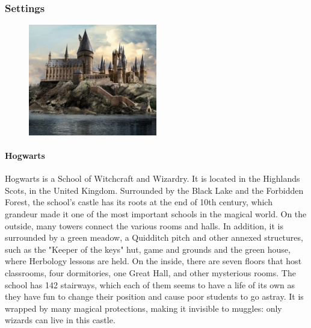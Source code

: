 \pagebreak

\subsubsection*{Settings}

\begin{figure}
\centering
\includegraphics[max width=0.5\textwidth]{../Pictures/Locations/Hogwarts/Castle_picture.png}
\end{figure}
\paragraph{Hogwarts}
Hogwarts is a School of Witchcraft and Wizardry. It is located in the Highlands Scots, in the United Kingdom. Surrounded by the Black Lake and the Forbidden Forest, the school's castle has its roots at the end of 10th century, which grandeur made it one of the most important schools in the magical world. On the outside, many towers connect the various rooms and halls. In addition, it is surrounded by a green meadow, a Quidditch pitch and other annexed structures, such as the "Keeper of the keys" hut, game and grounds and the green house, where Herbology lessons are held. On the inside, there are seven floors that host classrooms, four dormitories, one Great Hall, and other mysterious rooms. The school has 142 stairways, which each of them seems to have a life of its own as they have fun to change their position and cause poor students to go astray. It is wrapped by many magical protections, making it invisible to muggles: only wizards can live in this castle. 

